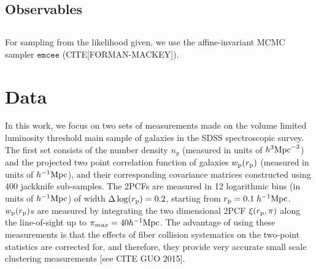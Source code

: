 \documentclass[12pt, preprint]{aastex}
\begin{document}
\subsection{Observables}

\subsection{}
For sampling from the likelihood given, we use the affine-invariant MCMC sampler $\mathtt{emcee}$ (CITE[FORMAN-MACKEY]).


\section{Data}

In this work, we focus on two sets of measurements made on the volume limited luminosity threshold main sample of galaxies 
in the SDSS spectroscopic survey. The first set consists of the number density $n_{g}$ (measured in units of $h^{3}\rm{Mpc}^{-3}$) 
and the projected two point correlation function of galaxies $w_{\rm{p}}(r_{\rm{p}})$ (measured in units of $h^{-1}\rm{Mpc}$), 
and their corresponding covariance matrices constructed using 400 jackknife sub-samples. 
The 2PCFs are measured in 12 logarithmic bins (in units of $h^{-1}\rm{Mpc}$) of width $\Delta \log(r_{\rm p}) = 0.2$, 
starting from $r_{\rm{p}} = 0.1 \; h^{-1}\rm{Mpc}$. $w_{\rm{p}}(r_{\rm{p}})$s are measured by integrating the two dimensional 
2PCF $\xi(r_{\rm{p}} , \pi)$ along the line-of-sight up to $\pi_{max}=40 h^{-1}\rm{Mpc}$. The advantage of using these measurements 
is that the effects of fiber collision systematics on the two-point statistics are corrected for, and therefore, they provide very 
accurate small scale clustering measurements [see CITE GUO 2015].
\end{document}
